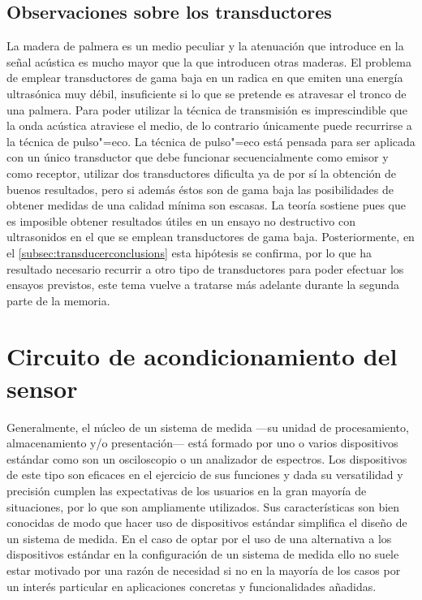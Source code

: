 \subsection{Observaciones sobre los transductores}

La madera de palmera es un medio peculiar y la atenuación que introduce en
la señal acústica es mucho mayor que la que introducen otras maderas. El
problema de emplear transductores de gama baja en un  radica en
que emiten una energía ultrasónica muy débil, insuficiente si lo que se
pretende es atravesar el tronco de una palmera. Para poder utilizar la
técnica de transmisión es imprescindible que la onda acústica atraviese el
medio, de lo contrario únicamente puede recurrirse a la técnica de
pulso"=eco. La técnica de pulso"=eco está pensada para ser aplicada con un
único transductor que debe funcionar secuencialmente como emisor y como
receptor, utilizar dos transductores dificulta ya de por sí la obtención de
buenos resultados, pero si además éstos son de gama baja las posibilidades
de obtener medidas de una calidad mínima son escasas. La teoría sostiene
pues que es imposible obtener resultados útiles en un ensayo no destructivo
con ultrasonidos en el que se emplean transductores de gama baja.
Posteriormente, en el \cref{subsec:transducerconclusions} esta hipótesis se
confirma, por lo que ha resultado necesario recurrir a otro tipo de
transductores para poder efectuar los ensayos previstos, este tema vuelve a
tratarse más adelante durante la segunda parte de la memoria.


\section{Circuito de acondicionamiento del sensor}\label{sec:rxco}

Generalmente, el núcleo de un sistema de medida ---su unidad de
procesamiento, almacenamiento y/o presentación--- está formado por uno o
varios dispositivos estándar como son un osciloscopio o un analizador de
espectros. Los dispositivos de este tipo son eficaces en el ejercicio de
sus funciones y dada su versatilidad y precisión cumplen las expectativas
de los usuarios en la gran mayoría de situaciones, por lo que son
ampliamente utilizados. Sus características son bien conocidas de modo que
hacer uso de dispositivos estándar simplifica el diseño de un sistema de
medida. En el caso de optar por el uso de una alternativa a los
dispositivos estándar en la configuración de un sistema de medida ello no
suele estar motivado por una razón de necesidad si no en la mayoría de los
casos por un interés particular en aplicaciones concretas y funcionalidades
añadidas.

